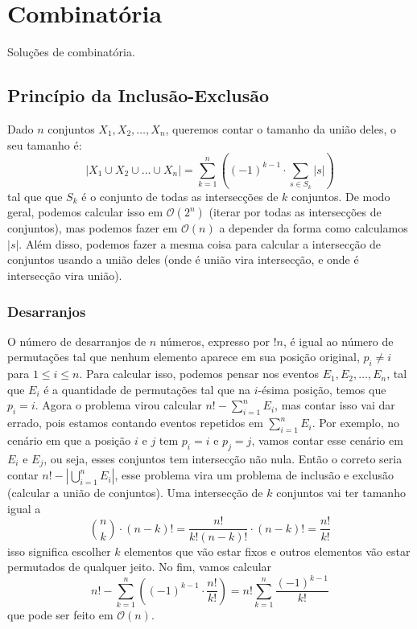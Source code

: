     
    \section{Combinatória}
    Soluções de combinatória.


    \subsection{Princípio da Inclusão-Exclusão}
    Dado $n$ conjuntos $X_1,X_2,\dots,X_n$, queremos contar o tamanho da união deles, o seu tamanho é: 
    $$|X_1 \cup X_2 \cup \dots \cup X_n| = \sum_{k = 1}^{n} \left((-1)^{k-1} \cdot \sum_{s \in S_k} |s| \right)$$
    tal que que $S_k$ é o conjunto de todas as intersecções de $k$ conjuntos. De modo geral, podemos calcular isso em $\mathcal{O}(2^n)$ (iterar por todas as intersecções de conjuntos), mas podemos fazer em $\mathcal{O}(n)$ a depender da forma como calculamos $|s|$. Além disso, podemos fazer a mesma coisa para calcular a intersecção de conjuntos usando a união deles (onde é união vira intersecção, e onde é intersecção vira união).

    \subsubsection{Desarranjos}
    O número de desarranjos de $n$ números, expresso por $!n$, é igual ao número de permutações tal que nenhum elemento aparece em sua posição original, $p_i \neq i$ para $1 \le i \le n$. Para calcular isso, podemos pensar nos eventos $E_1,E_2,\dots,E_n$, tal que $E_i$ é a quantidade de permutações tal que na $i$-ésima posição, temos que $p_i = i$. Agora o problema virou calcular $n! - \sum_{i=1}^n E_i$, mas contar isso vai dar errado, pois estamos contando eventos repetidos em $\sum_{i=1}^n E_i$. Por exemplo, no cenário em que a posição $i$ e $j$ tem $p_i = i$ e $p_j = j$, vamos contar esse cenário em $E_i$ e $E_j$, ou seja, esses conjuntos tem intersecção não nula. Então o correto seria contar $n! - \left| \bigcup_{i=1}^n E_i \right|$, esse problema vira um problema de inclusão e exclusão (calcular a união de conjuntos). Uma intersecção de $k$ conjuntos vai ter tamanho igual a
    $$\binom{n}{k} \cdot (n-k)! = \frac{n!}{k!(n-k)!} \cdot (n-k)! = \frac{n!}{k!}$$ isso significa escolher $k$ elementos que vão estar fixos e outros elementos vão estar permutados de qualquer jeito. No fim, vamos calcular
    $$n! - \sum_{k=1}^n \left( (-1)^{k-1} \cdot \frac{n!}{k!}\right) = n! \sum_{k=1}^n \frac{(-1)^{k-1}}{k!}$$ que pode ser feito em $\mathcal{O}(n)$.

